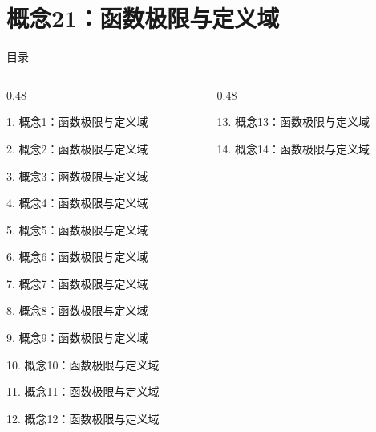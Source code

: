 \documentclass[aspectratio=169,10pt,fontset=fandol]{ctexbeamer}
\begin{document}
\section{概念21：函数极限与定义域}
\begin{frame}[t,fragile]{目录}
\small
\begin{columns}[T,onlytextwidth]
\begin{column}{0.48\textwidth}
{\color{black}\small 1. 概念1：函数极限与定义域\par}\vspace{0.22em}
{\color{black}\small 2. 概念2：函数极限与定义域\par}\vspace{0.22em}
{\color{black}\small 3. 概念3：函数极限与定义域\par}\vspace{0.22em}
{\color{black}\small 4. 概念4：函数极限与定义域\par}\vspace{0.22em}
{\color{black}\small 5. 概念5：函数极限与定义域\par}\vspace{0.22em}
{\color{black}\small 6. 概念6：函数极限与定义域\par}\vspace{0.22em}
{\color{black}\small 7. 概念7：函数极限与定义域\par}\vspace{0.22em}
{\color{black}\small 8. 概念8：函数极限与定义域\par}\vspace{0.22em}
{\color{black}\small 9. 概念9：函数极限与定义域\par}\vspace{0.22em}
{\color{black}\small 10. 概念10：函数极限与定义域\par}\vspace{0.22em}
{\color{black}\small 11. 概念11：函数极限与定义域\par}\vspace{0.22em}
{\color{black}\small 12. 概念12：函数极限与定义域\par}\vspace{0.22em}
\end{column}
\begin{column}{0.48\textwidth}
{\color{black}\small 13. 概念13：函数极限与定义域\par}\vspace{0.22em}
{\color{black}\small 14. 概念14：函数极限与定义域\par}\vspace{0.22em}

\end{column}
\end{columns}
\end{frame}
\end{document}
